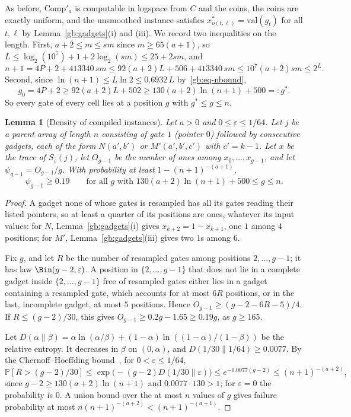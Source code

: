 \documentclass[11pt]{amsart}
\newtheorem{lemma}[theorem]{Lemma}
\theoremstyle{definition}
\theoremstyle{remark}
\newcommand{\eps}{\varepsilon}
\newcommand{\val}{\mathrm{val}}
\newcommand{\PP}{\mathbb{P}}
\newcommand{\Comp}{\mathrm{Comp}}
\begin{document}
As before, $\Comp'_a$ is computable in logspace from $C$ and the coins, the
coins are exactly uniform, and the unsmoothed instance satisfies
$x^*_{o(t,\ell)}=\val(g_t)$ for all $t,\ell$ by Lemma~\ref{gb:gadgets}(i)
and (iii). We record two inequalities on the length. First,
$a+2\le m\le sm$ since $m\ge65(a+1)$, so
$L\le\log_2(10^7)+1+2\log_2(sm)\le25+2sm$, and
\begin{equation}\label{gb:eq-nbound}
n+1=4P+2+413340\,sm\le92(a+2)L+506+413340\,sm\le10^7(a+2)sm\le2^L.
\end{equation}
Second, since $\ln(n+1)\le L\ln2\le0.6932\,L$ by~\eqref{gb:eq-nbound},
\begin{equation}\label{gb:eq-g0}
g_0=4P+2\ge92(a+2)L+502\ge130(a+2)\ln(n+1)+500=:g^*.
\end{equation}
So every gate of every cell lies at a position $g$ with $g^*\le g\le n$.

\begin{lemma}[Density of compiled instances]\label{gb:density}
Let $a>0$ and $0\le\eps\le1/64$. Let $j$ be a parent array of length $n$
consisting of gate $1$ (pointer $0$) followed by consecutive gadgets, each
of the form $N(a',b')$ or $M'(a',b',c')$ with $c'=k-1$. Let $x$ be the trace
of $S_\eps(j)$, let $O_{g-1}$ be the number of ones among
$x_0,\dots,x_{g-1}$, and let $\psi_{g-1}=O_{g-1}/g$. With probability at
least $1-(n+1)^{-(a+1)}$,
\[
\psi_{g-1}\ge0.19\qquad\text{for all $g$ with }
130(a+2)\ln(n+1)+500\le g\le n.
\]
\end{lemma}

\begin{proof}
A gadget none of whose gates is resampled has all its gates reading their
listed pointers, so at least a quarter of its positions are ones, whatever
its input values: for $N$, Lemma~\ref{gb:gadgets}(i) gives
$x_{k+2}=1-x_{k+1}$, one $1$ among $4$ positions; for $M'$,
Lemma~\ref{gb:gadgets}(iii) gives two $1$s among $6$.

Fix $g$, and let $R$ be the number of resampled gates among positions
$2,\dots,g-1$; it has law $\Bin(g-2,\eps)$. A position in $\{2,\dots,g-1\}$
that does not lie in a complete gadget inside $\{2,\dots,g-1\}$ free of
resampled gates either lies in a gadget containing a resampled gate, which
accounts for at most $6R$ positions, or in the last, incomplete gadget, at
most $5$ positions. Hence $O_{g-1}\ge(g-2-6R-5)/4$. If $R\le(g-2)/30$, this
gives $O_{g-1}\ge0.2g-1.65\ge0.19g$, as $g\ge165$.

Let $D(\alpha\|\beta)=\alpha\ln(\alpha/\beta)+(1-\alpha)\ln((1-\alpha)/(1-\beta))$
be the relative entropy. It decreases in $\beta$ on $(0,\alpha)$, and
$D(1/30\|1/64)\ge0.0077$. By the Chernoff--Hoeffding
bound~\cite{hoeffding}, for $0<\eps\le1/64$,
\[
\PP[R>(g-2)/30]\le\exp\bigl(-(g-2)D(1/30\|\eps)\bigr)\le e^{-0.0077(g-2)}
\le(n+1)^{-(a+2)},
\]
since $g-2\ge130(a+2)\ln(n+1)$ and $0.0077\cdot130>1$; for $\eps=0$ the
probability is $0$. A union bound over the at most $n$ values of $g$ gives
failure probability at most $n(n+1)^{-(a+2)}<(n+1)^{-(a+1)}$.
\end{proof}
\end{document}
